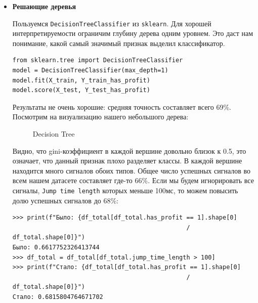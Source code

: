 \begin{itemize}
\item \textbf{Решающие деревья}

Пользуемся \texttt{DecisionTreeClassifier} из \texttt{sklearn}. Для хорошей интерпретируемости ограничим глубину дерева одним уровнем. Это даст нам понимание, какой самый значимый признак выделил классификатор.
\begin{verbatim}
from sklearn.tree import DecisionTreeClassifier
model = DecisionTreeClassifier(max_depth=1)
model.fit(X_train, Y_train_has_profit)
model.score(X_test, Y_test_has_profit)
\end{verbatim}

Результаты не очень хорошие: средняя точность составляет всего 69\%. Посмотрим на визуализацию нашего небольшого дерева:
\begin{figure}[H]
\caption{Decision Tree}
\label{fig:image}
\end{figure}

Видно, что gini-коэффициент в каждой вершине довольно близок к 0.5, это означает, что данный признак плохо разделяет классы. В каждой вершине находится много сигналов обоих типов. Общее число успешных сигналов во всем нашем датасете составляет где-то 66\%. Если мы будем игнорировать все сигналы,  \texttt{Jump time length} которых меньше 100мс, то можем повысить долю успешных сигналов до 68\%:

\begin{verbatim}
>>> print(f"Было: {df_total[df_total.has_profit == 1].shape[0] 
                                                / df_total.shape[0]}")
Было: 0.6617752326413744
>>> df_total = df_total[df_total.jump_time_length > 100]
>>> print(f"Стало: {df_total[df_total.has_profit == 1].shape[0] 
                                                / df_total.shape[0]}")
Стало: 0.6815804764671702
\end{verbatim}


\end{itemize}
